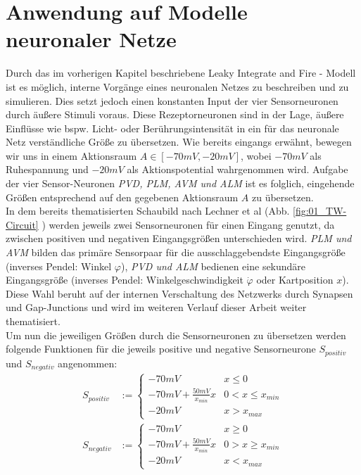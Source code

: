 \section{Anwendung auf Modelle neuronaler Netze}
\label{sec:lif_neuro}
	Durch das im vorherigen Kapitel beschriebene Leaky Integrate and Fire - Modell ist es möglich, interne Vorgänge eines neuronalen Netzes zu beschreiben und zu simulieren. Dies setzt jedoch einen konstanten Input der vier Sensorneuronen durch äußere Stimuli voraus. Diese Rezeptorneuronen sind in der Lage, äußere Einflüsse wie bspw. Licht- oder Berührungsintensität in ein für das neuronale Netz verständliche Größe zu übersetzen. Wie bereits eingangs erwähnt, bewegen wir uns in einem Aktionsraum $A\in[-70mV, -20mV]$, wobei $-70mV$ als Ruhespannung und $-20mV$ als Aktionspotential wahrgenommen wird. Aufgabe der vier Sensor-Neuronen \textit{PVD, PLM, AVM und ALM} ist es folglich, eingehende Größen entsprechend auf den gegebenen Aktionsraum $A$ zu übersetzen.\\
	In dem bereits thematisierten Schaubild nach Lechner et al (Abb. \ref{fig:01_TW-Circuit} \cite{WormLevelRL}) werden jeweils zwei Sensorneuronen für einen Eingang genutzt, da zwischen positiven und negativen Eingangsgrößen unterschieden wird. \textit{PLM und AVM} bilden das primäre Sensorpaar für die ausschlaggebendste Eingangsgröße (inverses Pendel: Winkel $\varphi$), \textit{PVD und ALM} bedienen eine sekundäre Eingangsgröße (inverses Pendel: Winkelgeschwindigkeit $\dot{\varphi}$ oder Kartposition $x$). Diese Wahl beruht auf der internen Verschaltung des Netzwerks durch Synapsen und Gap-Junctions und wird im weiteren Verlauf dieser Arbeit weiter thematisiert.\\
	Um nun die jeweiligen Größen durch die Sensorneuronen zu übersetzen werden folgende Funktionen für die jeweils positive und negative Sensorneurone $S_{positiv}$ und $S_{negativ}$ angenommen:
	\begin{align}
		\label{eq:sensor_translation_p}
		S_{positiv} &:= \begin{cases}-70mV & x\leq 0\\-70mV + \frac{50mV}{x_{min}}x & 0 < x \leq x_{min} \\-20mV & x > x_{max}  \end{cases}\\
		\label{eq:sensor_translation_n}
		S_{negativ} &:= \begin{cases}-70mV & x\geq 0\\-70mV + \frac{50mV}{x_{min}}x & 0 > x \geq x_{min} \\-20mV & x < x_{max}  \end{cases}
	\end{align}
